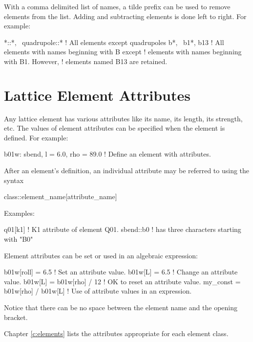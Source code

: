 {{{{{With a comma delimited list of names, a tilde prefix can be used to remove elements from the list.
Adding and subtracting elements is done left to right. For example:
\begin{example}
  *::*, ~quadrupole::*  ! All elements except quadrupoles
  b*, ~b1*, b13         ! All elements with names beginning with B except
                        !   elements with names beginning with B1. However,
                        !   elements named B13 are retained.
\end{example}

\section{Lattice Element Attributes}
\label{s:lat.attribs}

Any lattice element has various attributes like its name, its length,
its strength, etc. The values of element attributes can be
specified when the element is defined. For example:
\begin{example}
  b01w: sbend, l = 6.0, rho = 89.0 ! Define an element with attributes.
\end{example}
After an element's definition, an individual attribute may be referred
to using the syntax
\begin{example}
  class::element_name[attribute_name]
\end{example}
Examples:
\begin{example}
  q01[k1]                       ! K1 attribute of element Q01.
  sbend::b0%
                                !   has three characters starting with "B0"
\end{example}
Element attributes can be set or used in an algebraic expression:
\begin{example}
  b01w[roll] = 6.5                  ! Set an attribute value.
  b01w[L] = 6.5                     ! Change an attribute value.
  b01w[L] = b01w[rho] / 12          ! OK to reset an attribute value.
  my_const = b01w[rho] / b01w[L]    ! Use of attribute values in an expression.
\end{example}
Notice that there can be no space between the element name and the \vn{[} opening bracket.

Chapter \cref{c:elements} lists the attributes appropriate for each element class.

}}}}}
